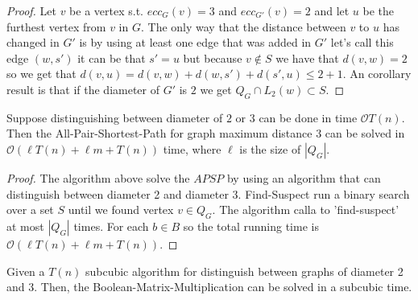 \begin{proof}
 Let $v$ be a vertex s.t. $ecc_{G}(v)=3$ and $ecc_{G'}(v)=2$ and let $u$ be the furthest vertex from $v$ in $G$.
 The only way that the distance between $v$ to $u$  has changed in $G'$ is by using at least one edge that was added in $G'$ let's call this edge $(w,s')$ it can be that $s'=u$ but because $v\not \in S$ we have that $d(v,w)=2$ so
 we get that $d(v,u) = d(v,w)+d(w,s')+d(s',u)\leq 2+1$.
 An corollary result is that if the diameter of $G'$ is $2$ we get  $Q_G\cap L_2(w) \subset S$.
\end{proof}


\begin{theorem}
Suppose distinguishing between diameter of $2$ or $3$ can be done in time $\mathcal{O}T(n)$. Then the All-Pair-Shortest-Path for graph maximum distance $3$ can be solved in $\mathcal{O}(\ell T(n)+\ell m+T(n))$ time, where $\ell$ is the size of $|Q_G|$. 
\end{theorem}

\begin{proof}
 The algorithm above solve the $APSP$  by using an algorithm that can distinguish between diameter 2 and diameter 3.
 Find-Suspect run a  binary search over a set $S$ 
 until we found vertex $v \in Q_G$. The algorithm calla to 'find-suspect' at most $|Q_G|$ times. For each $b \in B$ so the total running time is $\mathcal{O}(\ell T(n)+\ell m+T(n))$.
 
\end{proof}

\begin{theorem}
Given a $T(n)$ subcubic algorithm for distinguish between graphs of diameter 2 and 3. Then, the Boolean-Matrix-Multiplication can be solved in a subcubic time.
\end{theorem}

